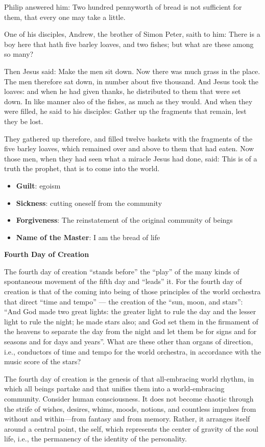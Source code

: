Philip answered him: Two hundred pennyworth of bread is not sufficient for them, that every one may take a little.

One of his disciples, Andrew, the brother of Simon Peter, saith to him: There is a boy here that hath five barley loaves, and two fishes; but what are these among so many?

Then Jesus said: Make the men sit down. Now there was much grass in the place. The men therefore sat down, in number about five thousand. And Jesus took the loaves: and when he had given thanks, he distributed to them that were set down. In like manner also of the fishes, as much as they would. And when they were filled, he said to his disciples: Gather up the fragments that remain, lest they be lost.

They gathered up therefore, and filled twelve baskets with the fragments of the five barley loaves, which remained over and above to them that had eaten. Now those men, when they had seen what a miracle Jesus had done, said: This is of a truth the prophet, that is to come into the world.

\begin{itemize}
\item \textbf{Guilt}: egoism 
\item \textbf{Sickness}: cutting oneself from the community 
\item \textbf{Forgiveness}: The reinstatement of the original community of beings 
\item \textbf{Name of the Master}: I am the bread of life 
\end{itemize}
\textbf{Fourth Day of Creation}

The fourth day of creation ``stands before'' the ``play'' of the many kinds of spontaneous movement of the fifth day and ``leads'' it. For the fourth day of creation is that of the coming into being of those principles of the world orchestra that direct ``time and tempo'' — the creation of the ``sun, moon, and stars'': ``And God made two great lights: the greater light to rule the day and the lesser light to rule the night; he made stars also; and God set them in the firmament of the heavens to separate the day from the night and let them be for signs and for seasons and for days and years''. What are these other than organs of direction, i.e., conductors of time and tempo for the world orchestra, in accordance with the music score of the stars?

The fourth day of creation is the genesis of that all-embracing world rhythm, in which all beings partake and that unifies them into a world-embracing community. Consider human consciousness. It does not become chaotic through the strife of wishes, desires, whims, moods, notions, and countless impulses from without and within—from fantasy and from memory. Rather, it arranges itself around a central point, the self, which represents the center of gravity of the soul life, i.e., the permanency of the identity of the personality.

